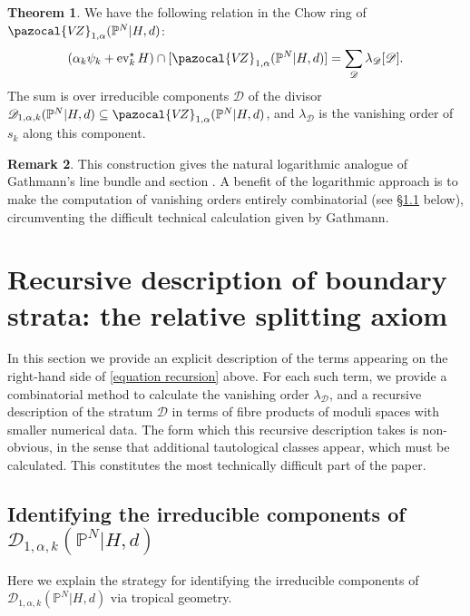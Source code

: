 \documentclass[11pt]{amsart}
\newcommand{\PP}{\mathbb P}
\newcommand{\VZ}{\pazocal{V\!Z}}
\newcommand{\st}{\star}
\newcommand{\ev}{\operatorname{ev}}
\newcommand{\Dcal}{\mathcal{D}}
\theoremstyle{definition}
\newtheorem{thm}{Theorem}[section]
\theoremstyle{definition}
\newtheorem{remark}[thm]{Remark}
\begin{document}
\begin{thm} \label{theorem recursion} We have the following relation in the Chow ring of $\VZ_{1,\alpha}(\PP^N|H,d)$:
\begin{equation}\label{equation recursion} (\alpha_k \psi_k + \ev_k^\st H) \cap [\VZ_{1,\alpha}(\PP^N|H,d)] = \sum_{\Dcal} \lambda_\Dcal [ \Dcal ].\end{equation}
The sum is over irreducible components $\Dcal$ of the divisor $\Dcal_{1,\alpha,k}(\PP^N|H,d) \subseteq \VZ_{1,\alpha}(\PP^N|H,d)$, and $\lambda_\Dcal$ is the vanishing order of $s_k$ along this component. \end{thm}

\begin{remark} This construction gives the natural logarithmic analogue of Gathmann's line bundle and section \cite[Construction 2.1]{Ga}. A benefit of the logarithmic approach is to make the computation of vanishing orders entirely combinatorial (see \S \ref{} below), circumventing the difficult technical calculation given by Gathmann. \end{remark}

\section{Recursive description of boundary strata: the relative splitting axiom}\label{section reduced splitting axiom}
In this section we provide an explicit description of the terms appearing on the right-hand side of \eqref{equation recursion} above. For each such term, we provide a combinatorial method to calculate the vanishing order $\lambda_\Dcal$, and a recursive description of the stratum $\Dcal$ in terms of fibre products of moduli spaces with smaller numerical data. The form which this recursive description takes is non-obvious, in the sense that additional tautological classes appear, which must be calculated. This constitutes the most technically difficult part of the paper. 


\subsection{Identifying the irreducible components of $\Dcal_{1,\alpha,k}(\PP^N|H,d)$} Here we explain the strategy for identifying the irreducible components of $\Dcal_{1,\alpha,k}(\PP^N|H,d)$ via tropical geometry.
\end{document}

